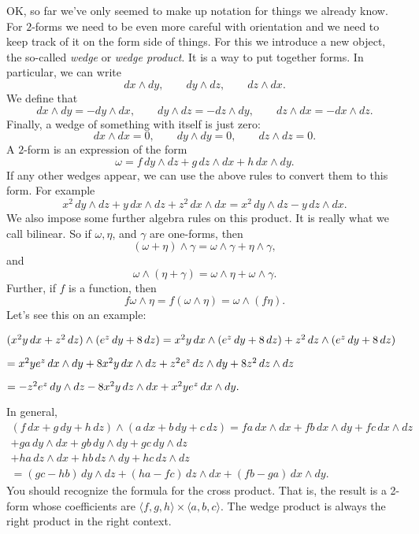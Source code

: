\documentclass[12pt]{article}
\begin{document}
OK, so far we've only seemed to make up notation for things we already know.
For $2$-forms we need to be even more careful with orientation and we
need to keep track of it on the form side of things.  For this we introduce
a new object, the so-called \emph{wedge} or \emph{wedge product}.  It is a
way to put together forms.  In particular, we can
write
$$
dx \wedge dy, \qquad
dy \wedge dz, \qquad
dz \wedge dx .
$$
We define that 
$$
dx \wedge dy = - dy \wedge dx, \qquad
dy \wedge dz = - dz \wedge dy, \qquad
dz \wedge dx = - dx \wedge dz .
$$
Finally, a wedge of something with itself is just zero:
$$
dx \wedge dx = 0, \qquad
dy \wedge dy = 0, \qquad
dz \wedge dz = 0 .
$$
A $2$-form is an expression of the form
$$
\omega = 
f\, dy \wedge dz + 
g\, dz \wedge dx +
h\, dx \wedge dy .
$$
If any other wedges appear, we can use the above rules to convert them to this
form.  For example
$$
x^2 \, dy \wedge dz + 
y \, dx \wedge dz +
z^2\, dx \wedge dx 
=
x^2 \, dy \wedge dz - y \, dz \wedge dx .
$$
We also impose some further algebra rules on this product.  It is really
what we call bilinear.  So if $\omega, \eta$, and $\gamma$ are one-forms, then
$$
(\omega + \eta) \wedge \gamma
=
\omega \wedge \gamma
+
\eta \wedge \gamma ,
$$
and
$$
\omega \wedge (\eta + \gamma)
=
\omega \wedge \eta
+
\omega \wedge \gamma .
$$
Further, if $f$ is a function, then
$$
f \omega \wedge \eta =
f (\omega \wedge \eta) =
\omega \wedge ( f \eta) .
$$
Let's see this on an example:

$
( x^2 y \, dx + z^2 \, dz) \wedge (e^z \, dy + 8 \, dz)
=
x^2 y \, dx \wedge (e^z \, dy + 8 \, dz)
+
z^2 \, dz \wedge (e^z \, dy + 8 \, dz)
\hfill
$

$
\hfill
=
x^2 y e^z \, dx \wedge dy
+
8 x^2 y \, dx \wedge dz
+
z^2 e^z \, dz \wedge dy
+
8 z^2 \, dz \wedge dz
\hfill
$

$
\hfill
=
- z^2 e^z \, dy \wedge dz
-
8 x^2 y \, dz \wedge dx
+
x^2 y e^z \, dx \wedge dy .
$

In general,
\begin{multline*}
(f\, dx + g\, dy + h \, dz) \wedge
(a\, dx + b\, dy + c \, dz)
=
fa\, dx \wedge dx +
fb\, dx \wedge dy +
fc\, dx \wedge dz
\\
+
ga\, dy \wedge dx +
gb\, dy \wedge dy +
gc\, dy \wedge dz 
\\
+
ha\, dz \wedge dx +
hb\, dz \wedge dy +
hc\, dz \wedge dz
\\
=
(gc-hb)\, dy \wedge dz +
(ha-fc)\, dz \wedge dx +
(fb - ga) \, dx \wedge dy .
\end{multline*}
You should recognize the formula for the cross product.  That is,
the result is a 2-form whose coefficients are
$\langle f,g,h \rangle \times
\langle a,b,c \rangle$.
The wedge product
is always the right product in the right context.
\end{document}
